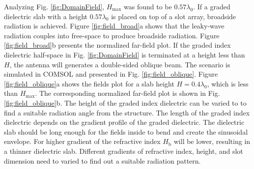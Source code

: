 Analyzing Fig. \ref{fig:DomainField}, $H_{\mathrm{max}}$ was found to be $0.57 \lambda_0$. If a graded dielectric slab with a height $0.57 \lambda_0$ is placed on top of a slot array, broadside radiation is achieved. Figure \ref{fig:field_broad}a shows that the leaky-wave radiation couples into free-space to produce broadside radiation. Figure \ref{fig:field_broad}b presents the normalized far-field plot. If the graded index dielectric half-space in Fig. \ref{fig:DomainField} is terminated at a height less than $H$, the antenna will generates a double-sided oblique beam.  The scenario is simulated in COMSOL and presented in Fig. \ref{fig:field_oblique}. Figure \ref{fig:field_oblique}a shows the fields plot for a slab height $H = 0.4 \lambda_0$, which is less than $H_{\mathrm{max}}$. The corresponding normalized far-field plot is shown in Fig. \ref{fig:field_oblique}b. The height of the graded index dielectric can be varied to to find a suitable radiation angle from the structure. The length of the graded index dielectric depends on the gradient profile of the graded dielectric. The dielectric slab should be long enough for the fields inside to bend and create the sinusoidal envelope. For higher gradient of the refractive index $H_\mathrm{b}$ will be lower, resulting in a thinner dielectric slab. Different gradients of refractive index, height, and slot dimension need to varied to find out a suitable radiation pattern.
